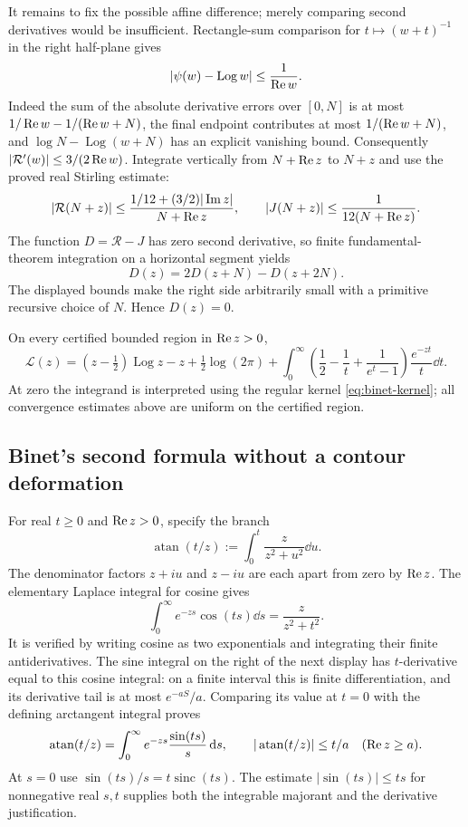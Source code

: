 It remains to fix the possible affine difference; merely comparing
second derivatives would be insufficient. Rectangle-sum comparison for
$t\mapsto(w+t)^{-1}$ in the right half-plane gives
\begin{equation}
 |\psi(w)-\operatorname{Log}w|\le\frac1{\operatorname{Re} w}.
 \label{eq:complex-psi-bound}
\end{equation}
Indeed the sum of the absolute derivative errors over $[0,N]$ is at
most $1/\operatorname{Re} w-1/(\operatorname{Re} w+N)$, the final endpoint contributes at most
$1/(\operatorname{Re} w+N)$, and
$\log N-\operatorname{Log}(w+N)$ has an explicit vanishing bound.
Consequently $|\mathcal R'(w)|\le3/(2\operatorname{Re} w)$. Integrate vertically
from $N+\operatorname{Re} z$ to $N+z$ and use the proved real Stirling estimate:
\[
 |\mathcal R(N+z)|\le
 \frac{1/12+(3/2)|\operatorname{Im} z|}{N+\operatorname{Re} z},\qquad
 |J(N+z)|\le\frac1{12(N+\operatorname{Re} z)}.
\]
The function $D=\mathcal R-J$ has zero second derivative, so finite
fundamental-theorem integration on a horizontal segment yields
\[
 D(z)=2D(z+N)-D(z+2N).
\]
The displayed bounds make the right side arbitrarily small with a
primitive recursive choice of $N$. Hence $D(z)=0$.

\begin{theorem}
On every certified bounded region in $\operatorname{Re} z>0$,
\[
 \boxed{\displaystyle
 \mathcal L(z)=(z-\tfrac12)\operatorname{Log}z-z
 +\tfrac12\log(2\pi)
 +\int_0^\infty
 \left(\frac12-\frac1t+\frac1{e^t-1}\right)
                 \frac{e^{-zt}}t\dd t.}
\]
At zero the integrand is interpreted using the regular kernel
\eqref{eq:binet-kernel}; all convergence estimates above are uniform
on the certified region.
\end{theorem}

\subsection{Binet's second formula without a contour deformation}

For real $t\ge0$ and $\operatorname{Re} z>0$, specify the branch
\[
 \operatorname{atan}(t/z):=
                 \int_0^t\frac{z}{z^2+u^2}\dd u.
\]
The denominator factors $z+iu$ and $z-iu$ are each apart from zero
by $\operatorname{Re} z$. The elementary Laplace integral for cosine gives
\[
 \int_0^\infty e^{-zs}\cos(ts)\dd s=\frac{z}{z^2+t^2}.
\]
It is verified by writing cosine as two exponentials and integrating
their finite antiderivatives. The sine integral on the right of the
next display has $t$-derivative equal to this cosine integral: on a
finite interval this is finite differentiation, and its derivative
tail is at most $e^{-aS}/a$. Comparing its value at $t=0$ with the
defining arctangent integral proves
\begin{equation}
 \operatorname{atan}(t/z)=
       \int_0^\infty e^{-zs}\frac{\sin(ts)}s\,\mathrm d s,
 \qquad |\operatorname{atan}(t/z)|\le t/a
 \quad(\operatorname{Re} z\ge a).
 \label{eq:atan-laplace}
\end{equation}
At $s=0$ use $\sin(ts)/s=t\operatorname{sinc}(ts)$. The estimate
$|\sin(ts)|\le ts$ for nonnegative real $s,t$ supplies both the
integrable majorant and the derivative justification.

